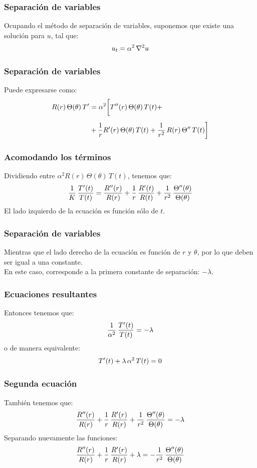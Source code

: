 \documentclass[12pt]{beamer}
\begin{document}
\begin{frame}
\frametitle{Separación de variables}
Ocupando el método de separación de variables, suponemos que existe una solución para $u$, tal que:
\pause
\begin{align*}
u_{t} = \alpha^{2} \, \laplacian{u}
\end{align*}
\end{frame}
\begin{frame}[fragile]
\frametitle{Separación de variables}
Puede expresarse como:
\pause
\begin{align*}
R(r) \, \Theta (\theta) \, T^{\prime} &= \alpha^{2} \bigg[ {T}^{\prime \prime} (r) \, \Theta (\theta) \, T(t) + \\[0.5em]
&+ \dfrac{1}{r} {R}^{\prime} (r) \, \Theta(\theta) \, T(t) + \dfrac{1}{r^{2}} \, R(r) \, {\Theta}^{\prime \prime} \, T(t) \bigg]
\end{align*}
\end{frame}
\begin{frame}
\frametitle{Acomodando los términos}
Dividiendo entre $\alpha^{2} R(r) \, \Theta (\theta) \, T(t)$, tenemos que:
\pause
\begin{align}
\dfrac{1}{K} \, \dfrac{{T}^{\prime} (t)}{T (t)} = \dfrac{{R}^{\prime \prime} (r)}{R (r)} + \dfrac{1}{r} \, \dfrac{{R}^{\prime} (t)}{R (t)} + \dfrac{1}{r^{2}} \, \dfrac{{\Theta}^{\prime \prime} (\theta)}{\Theta (\theta)}
\label{eq:ecuacion_K01}
\end{align}
\pause
El lado izquierdo de la ecuación es función sólo de $t$.
\end{frame}
\begin{frame}
\frametitle{Separación de variables}
Mientras que el lado derecho de la ecuación es función de $r$ y $\theta$, por lo que deben ser igual a una constante.
\\
\bigskip
\pause
En este caso, corresponde a la primera constante de separación: $- \lambda$.
\end{frame}
\begin{frame}
\frametitle{Ecuaciones resultantes}
Entonces tenemos que:
\pause
\begin{align*}
\dfrac{1}{\alpha^{2}} \, \dfrac{{T}^{\prime} (t)}{T (t)} = - \lambda
\end{align*}
o de manera equivalente:
\pause
\begin{align}
{T}^{\prime}(t) + \lambda \, \alpha^{2} \, T(t) = 0
\label{eq:ecuacion_K02}    
\end{align}
\end{frame}
\begin{frame}
\frametitle{Segunda ecuación}
También tenemos que:
\pause
\begin{align*}
\dfrac{{R}^{\prime \prime} (r)}{R (r)} + \dfrac{1}{r} \, \dfrac{{R}^{\prime} (r)}{R (r)} + \dfrac{1}{r^{2}} \, \dfrac{{\Theta}^{\prime \prime} (\theta)}{\Theta (\theta)} = - \lambda
\end{align*}
\pause
Separando nuevamente las funciones:
\pause
\begin{align*}
\dfrac{{R}^{\prime \prime} (r)}{R (r)} + \dfrac{1}{r} \, \dfrac{{R}^{\prime} (r)}{R (r)} + \lambda = - \dfrac{1}{r^{2}} \, \dfrac{{\Theta}^{\prime \prime} (\theta)}{\Theta (\theta)}
\end{align*}
\end{frame}
\end{document}
